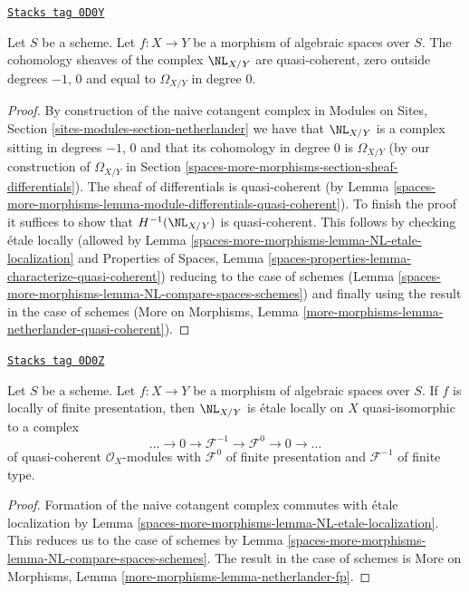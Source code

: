 \begin{lemma}
\label{spaces-more-morphisms-lemma-netherlander-quasi-coherent}
\href{https://stacks.math.columbia.edu/tag/0D0Y}{\texttt{Stacks tag 0D0Y}}

Let $S$ be a scheme. Let $f : X \to Y$ be a morphism of
algebraic spaces over $S$. The cohomology sheaves
of the complex $\NL_{X/Y}$ are quasi-coherent, zero outside
degrees $-1$, $0$ and equal to $\Omega_{X/Y}$ in degree $0$.
\end{lemma}

\begin{proof}
By construction of the naive cotangent complex in
Modules on Sites, Section \ref{sites-modules-section-netherlander}
we have that $\NL_{X/Y}$ is a complex sitting in degrees $-1$, $0$
and that its cohomology in degree $0$ is $\Omega_{X/Y}$ (by our
construction of $\Omega_{X/Y}$ in Section \ref{spaces-more-morphisms-section-sheaf-differentials}).
The sheaf of differentials is quasi-coherent (by
Lemma \ref{spaces-more-morphisms-lemma-module-differentials-quasi-coherent}).
To finish the proof it suffices to show that $H^{-1}(\NL_{X/Y})$
is quasi-coherent. This follows by checking \'etale locally
(allowed by Lemma \ref{spaces-more-morphisms-lemma-NL-etale-localization} and
Properties of Spaces, Lemma
\ref{spaces-properties-lemma-characterize-quasi-coherent})
reducing to the case of schemes
(Lemma \ref{spaces-more-morphisms-lemma-NL-compare-spaces-schemes})
and finally using the result in the case of schemes
(More on Morphisms, Lemma
\ref{more-morphisms-lemma-netherlander-quasi-coherent}).
\end{proof}

\begin{lemma}[Netherlander fp]
\label{spaces-more-morphisms-lemma-netherlander-fp}
\href{https://stacks.math.columbia.edu/tag/0D0Z}{\texttt{Stacks tag 0D0Z}}

Let $S$ be a scheme.
Let $f : X \to Y$ be a morphism of algebraic spaces over $S$.
If $f$ is locally of finite
presentation, then $\NL_{X/Y}$ is \'etale locally on $X$
quasi-isomorphic to a complex
$$
\ldots \to 0 \to \mathcal{F}^{-1} \to \mathcal{F}^0 \to 0 \to \ldots
$$
of quasi-coherent $\mathcal{O}_X$-modules
with $\mathcal{F}^0$ of finite presentation
and $\mathcal{F}^{-1}$ of finite type.
\end{lemma}

\begin{proof}
Formation of the naive cotangent complex commutes with \'etale
localization by Lemma \ref{spaces-more-morphisms-lemma-NL-etale-localization}.
This reduces us to the case of schemes by
Lemma \ref{spaces-more-morphisms-lemma-NL-compare-spaces-schemes}.
The result in the case of schemes is
More on Morphisms, Lemma
\ref{more-morphisms-lemma-netherlander-fp}.
\end{proof}

